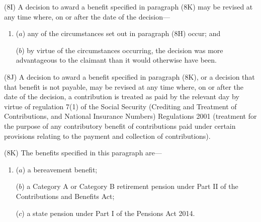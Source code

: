 \documentclass[12pt,a4paper]{article}
\begin{document}
(8I) A decision to award a benefit specified in paragraph (8K) may be revised at any time where, on or after the date of the decision—
\begin{enumerate}\item[]
($a$) any of the circumstances set out in paragraph (8H) occur; and

($b$) by virtue of the circumstances occurring, the decision was more advantageous to the claimant than it would otherwise have been.
\end{enumerate}

(8J) A decision to award a benefit specified in paragraph (8K), or a decision that that benefit is not payable, may be revised at any time where, on or after the date of the decision, a contribution is treated as paid by the relevant day by virtue of regulation 7(1) of the Social Security (Crediting and Treatment of Contributions, and National Insurance Numbers) Regulations 2001 (treatment for the purpose of any contributory benefit of contributions paid under certain provisions relating to the payment and collection of contributions).

(8K) The benefits specified in this paragraph are—
\begin{enumerate}\item[]
($a$) a bereavement benefit;

($b$) a Category A or Category B retirement pension under Part II of the Contributions and Benefits Act;

($c$) a state pension under Part I of the Pensions Act 2014.
\end{enumerate}

\end{document}
